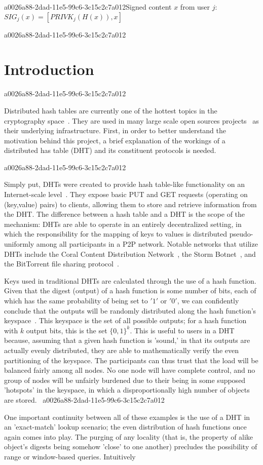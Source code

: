 \documentclass[12pt]{article}
\begin{document}
a0026a88-2dad-11e5-99c6-3c15c2c7a012Signed content $x$ from user $j$: $SIG_j(x) = \left[ PRIVK_j( H(x) ), x \right]$

a0026a88-2dad-11e5-99c6-3c15c2c7a012\section{Introduction}
a0026a88-2dad-11e5-99c6-3c15c2c7a012\par Distributed hash tables are currently one of the hottest topics in the cryptography space~\cite{Stoica:2001dj,Rowstron:2001ea,Ratnasamy:2001wn}. They are used in many large scale open sources projects~\cite{Freitas:2013tb,Xu:2010vs,Perfitt:2010fh} as their underlying infrastructure. First, in order to better understand the motivation behind this project, a brief explanation of the workings of a distributed has table (DHT) and its constituent protocols is needed.

a0026a88-2dad-11e5-99c6-3c15c2c7a012\par Simply put, DHTs were created to provide hash table-like functionality on an Internet-scale level~\cite{Ratnasamy:2001wn}. They expose basic PUT and GET requests (operating on (key,value) pairs) to clients, allowing them to store and retrieve information from the DHT. The difference between a hash table and a DHT is the scope of the mechanism: DHTs are able to operate in an entirely decentralized setting, in which the responsibility for the mapping of keys to values is distributed pseudo-uniformly among all participants in a P2P network. Notable networks that utilize DHTs include the Coral Content Distribution Network~\cite{Freedman:2004vb}, the Storm Botnet~\cite{Holz:2008uk}, and the BitTorrent file sharing protocol~\cite{Cohen:y1_8mBnw}.

\par Keys used in traditional DHTs are calculated through the use of a hash function. Given that the digest (output) of a hash function is some number of bits, each of which has the same probability of being set to $'1'$ or $'0'$, we can confidently conclude that the outputs will be randomly distributed along the hash function's keyspace~. This keyspace is the set of all possible outputs; for a hash function with $k$ output bits, this is the set $\{0,1\}^k$. This is useful to users in a DHT because, assuming that a given hash function is 'sound,' in that its outputs are actually evenly distributed, they are able to mathematically verify the even partitioning of the keyspace. The participants can thus trust that the load will be balanced fairly among all nodes. No one node will have complete control, and no group of nodes will be unfairly burdened due to their being in some supposed 'hotspots' in the keyspace, in which a disproportionally high number of objects are stored.~
a0026a88-2dad-11e5-99c6-3c15c2c7a012
\par One important continuity between all of these examples is the use of a DHT in an 'exact-match' lookup scenario; the even distribution of hash functions once again comes into play. The purging of any locality (that is, the property of alike object's digests being somehow 'close' to one another) precludes the possibility of range or window-based queries. Intuitively
\end{document}
